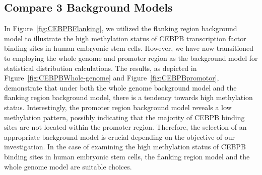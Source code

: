 \documentclass{PHlab-thesis}
\begin{document}
\subsection{Compare 3 Background Models}
In Figure~\ref{fig:CEBPBFlanking}, we utilized the flanking region background model to illustrate the high methylation status of CEBPB transcription factor binding sites in human embryonic stem cells. However, we have now transitioned to employing the whole genome and promoter region as the background model for statistical distribution calculations. The results, as depicted in Figure~\ref{fig:CEBPBWhole-genome} and Figure~\ref{fig:CEBPBpromotor}, demonstrate that under both the whole genome background model and the flanking region background model, there is a tendency towards high methylation status. Interestingly, the promoter region background model reveals a low methylation pattern, possibly indicating that the majority of CEBPB binding sites are not located within the promoter region. Therefore, the selection of an appropriate background model is crucial depending on the objective of our investigation. In the case of examining the high methylation status of CEBPB binding sites in human embryonic stem cells, the flanking region model and the whole genome model are suitable choices.
\end{document}
